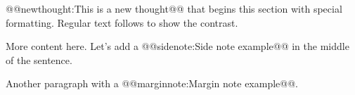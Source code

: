 \documentclass{article}
\makeatletter
\def\newthought#1{@@newthought:#1@@}
\def\marginnote#1{@@marginnote:#1@@}
\def\sidenote#1{@@sidenote:#1@@}
\newcommand{\newthought}[1]{\textsc{#1}}
\newcommand{\marginnote}[1]{\marginpar{#1}}
\newcommand{\sidenote}[1]{\footnote{#1}}
\makeatother
\begin{document}
\newthought{This is a new thought} that begins this section with special formatting. 
Regular text follows to show the contrast.

More content here. Let's add a \sidenote{Side note example} in the middle of the sentence.

Another paragraph with a \marginnote{Margin note example}.
\end{document}
